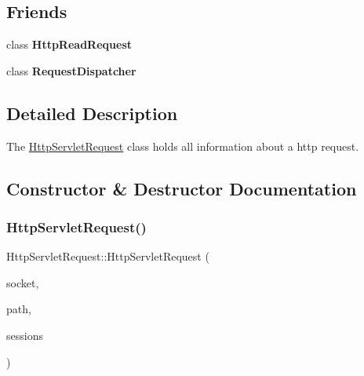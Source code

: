 \subsection*{Friends}
\begin{DoxyCompactItemize}
\item 
\mbox{\label{class_http_servlet_request_a4d54f5003e07e218070a449c22a52c7c}} 
class {\bfseries Http\+Read\+Request}
\item 
\mbox{\label{class_http_servlet_request_ae82f2dbbf52e70637edba766141fd80e}} 
class {\bfseries Request\+Dispatcher}
\end{DoxyCompactItemize}


\subsection{Detailed Description}
The \mbox{\hyperlink{class_http_servlet_request}{Http\+Servlet\+Request}} class holds all information about a http request. 

\subsection{Constructor \& Destructor Documentation}
\mbox{\label{class_http_servlet_request_acda91961621ef7bcd0fe061d0612bc2c}} 
\subsubsection{\texorpdfstring{Http\+Servlet\+Request()}{HttpServletRequest()}}
{\footnotesize\ttfamily Http\+Servlet\+Request\+::\+Http\+Servlet\+Request (\begin{DoxyParamCaption}\item[{Q\+Tcp\+Socket \&}]{socket,  }\item[{const Q\+String \&}]{path,  }\item[{\mbox{\hyperlink{class_q_map_thread_safety}{Q\+Map\+Thread\+Safety}}$<$ Q\+String, \mbox{\hyperlink{class_http_session}{Http\+Session}} $\ast$$>$ \&}]{sessions }\end{DoxyParamCaption})\hspace{0.3cm}{\ttfamily [explicit]}}




